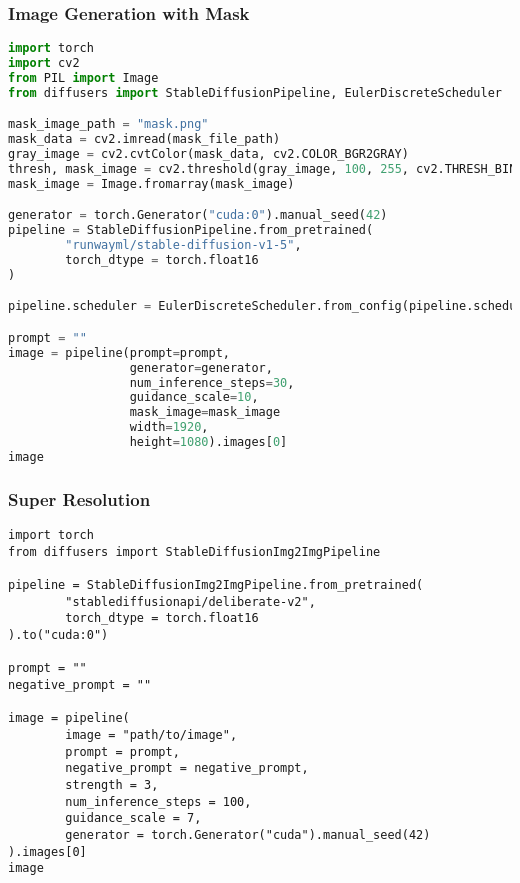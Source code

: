 \subsubsection{Image Generation with Mask}
\begin{lstlisting}[language=Python]
import torch
import cv2
from PIL import Image
from diffusers import StableDiffusionPipeline, EulerDiscreteScheduler

mask_image_path = "mask.png"
mask_data = cv2.imread(mask_file_path)
gray_image = cv2.cvtColor(mask_data, cv2.COLOR_BGR2GRAY)
thresh, mask_image = cv2.threshold(gray_image, 100, 255, cv2.THRESH_BINARY)
mask_image = Image.fromarray(mask_image)

generator = torch.Generator("cuda:0").manual_seed(42)
pipeline = StableDiffusionPipeline.from_pretrained(
        "runwayml/stable-diffusion-v1-5",
        torch_dtype = torch.float16
)

pipeline.scheduler = EulerDiscreteScheduler.from_config(pipeline.scheduler.config)

prompt = ""
image = pipeline(prompt=prompt,
                 generator=generator,
                 num_inference_steps=30,
                 guidance_scale=10,
                 mask_image=mask_image
                 width=1920,
                 height=1080).images[0]
image
\end{lstlisting}

\subsubsection{Super Resolution}
\begin{lstlisting}
import torch
from diffusers import StableDiffusionImg2ImgPipeline

pipeline = StableDiffusionImg2ImgPipeline.from_pretrained(
        "stablediffusionapi/deliberate-v2",
        torch_dtype = torch.float16
).to("cuda:0")

prompt = ""
negative_prompt = ""

image = pipeline(
        image = "path/to/image",
        prompt = prompt,
        negative_prompt = negative_prompt,
        strength = 3,
        num_inference_steps = 100,
        guidance_scale = 7,
        generator = torch.Generator("cuda").manual_seed(42)
).images[0]
image
\end{lstlisting}